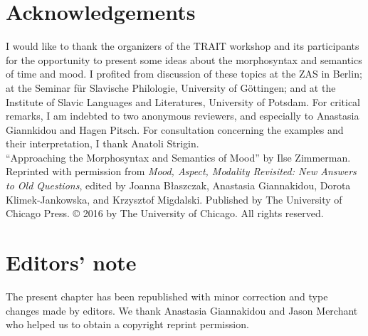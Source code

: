 \documentclass[output=paper,colorlinks,citecolor=brown]{langscibook}
\begin{document}
\begin{otherlanguage}{english}

\section*{Acknowledgements}

I would like to thank the organizers of the TRAIT workshop and its participants for the opportunity to present some ideas about the morphosyntax and semantics of time and mood. I profited from discussion of these topics at the ZAS in Berlin; at the Seminar für Slavische Philologie, University of Göttingen; and at the Institute of Slavic Languages and Literatures, University of Potsdam. For critical remarks, I am indebted to two anonymous reviewers, and especially to Anastasia Giannkidou and Hagen Pitsch. For consultation concerning the examples and their interpretation, I thank Anatoli Strigin. \\

\noindent ``Approaching the Morphosyntax and Semantics of Mood'' by Ilse Zimmerman. Reprinted with permission from \emph{Mood, Aspect, Modality Revisited: New Answers to Old Questions}, edited by Joanna Błaszczak, Anastasia Giannakidou, Dorota Klimek-Jankowska, and Krzysztof Migdalski. Published by The University of Chi\-ca\-go Press. © 2016 by The University of Chicago. All rights reserved.

\section*{Editors' note}
The present chapter has been republished with minor correction and type changes made by editors. We thank Anastasia Giannakidou and Jason Merchant who helped us to obtain a copyright reprint permission. 


\sloppy
\printbibliography[heading=subbibliography,notkeyword=this]

\end{otherlanguage}
\end{document}
